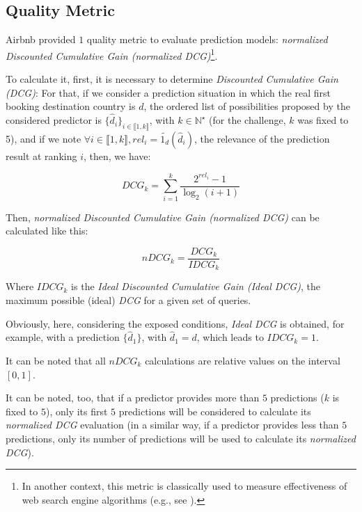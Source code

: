 \documentclass[twocolumn, switch]{article}
\begin{document}
\subsection{Quality Metric}

Airbnb provided $1$ quality metric to evaluate prediction models: \textit{normalized Discounted Cumulative Gain (normalized DCG)}\footnote{In another context, this metric is classically used to measure effectiveness of web search engine algorithms (e.g., see \cite{Burges_2005}).}.

To calculate it, first, it is necessary to determine \textit{Discounted Cumulative Gain (DCG)}: For that, if we consider a prediction situation in which the real first booking destination country is $d$, the ordered list of possibilities proposed by the considered predictor is $\{\hat{d}_{i}\}_{i \in \llbracket 1, k \rrbracket}$, with $k \in \mathbb{N}^{\star}$ (for the challenge, $k$ was fixed to 5), and if we note $\forall i \in \llbracket 1, k \rrbracket, rel_{i} = \widetilde{1_{d}}\left(\hat{d}_{i}\right)$, the relevance of the prediction result at ranking $i$, then, we have:

$$DCG_{k} = \sum_{i = 1}^{k} \frac{2^{rel_{i}} - 1}{\log_{2}(i + 1)}$$

Then, \textit{normalized Discounted Cumulative Gain (normalized DCG)} can be calculated like this:

$$nDCG_{k} = \frac{DCG_{k}}{IDCG_{k}}$$

Where $IDCG_{k}$ is the \textit{Ideal Discounted Cumulative Gain (Ideal DCG)}, the maximum possible (ideal) \textit{DCG} for a given set of queries.

Obviously, here, considering the exposed conditions, \textit{Ideal DCG} is obtained, for example, with a prediction $\{\hat{d}_{1}\}$, with $\hat{d}_{1} = d$, which leads to $IDCG_{k} = 1$.

It can be noted that all $nDCG_{k}$ calculations are relative values on the interval $\left[0, 1\right]$.

It can be noted, too, that if a predictor provides more than $5$ predictions ($k$ is fixed to $5$), only its first $5$ predictions will be considered to calculate its \textit{normalized DCG} evaluation (in a similar way, if a predictor provides less than $5$ predictions, only its number of predictions will be used to calculate its \textit{normalized DCG}).
\end{document}
